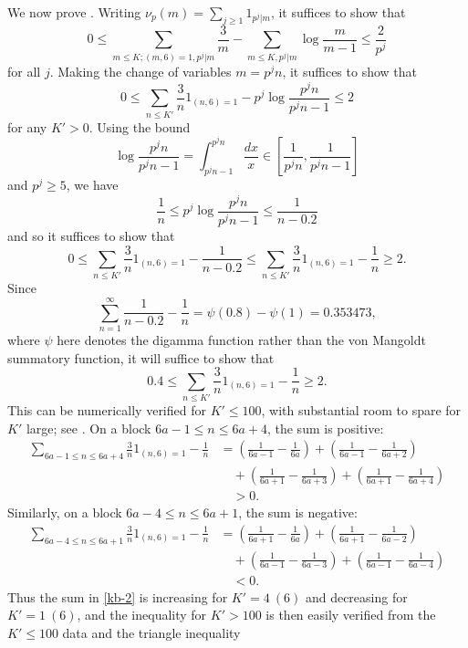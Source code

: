 \documentclass[12pt,a4paper,reqno]{amsart}
\numberwithin{equation}{section}
\theoremstyle{plain}
\theoremstyle{definition}
\begin{document}
We now prove . Writing $\nu_p(m) = \sum_{j \geq 1} 1_{p^j|m}$, it suffices to show that
  $$ 0 \leq \sum_{m \leq K; (m,6)=1, p^j|m} \frac{3}{m}
  - \sum_{m \leq K, p^j|m} \log \frac{m}{m-1} \leq \frac{2}{p^j}$$
  for all $j$.  Making the change of variables $m = p^j n$, it suffices to show that
  $$ 0 \leq \sum_{n \leq K'} \frac{3}{n} 1_{(n,6)=1} - p^j \log \frac{p^j n}{p^j n - 1} \leq 2$$
  for any $K' > 0$.   Using the bound
  $$ \log \frac{p^jn}{p^jn - 1} = \int_{p^jn-1}^{p^jn} \frac{dx}{x} \in [\frac{1}{p^j n}, \frac{1}{p^jn-1}]$$
  and $p^j \geq 5$, we have
  $$ \frac{1}{n} \leq p^j \log \frac{p^j n}{p^j n - 1} \leq \frac{1}{n-0.2}$$
  and so it suffices to show that
  \begin{equation}\label{kb}
  0 \leq \sum_{n \leq K'} \frac{3}{n} 1_{(n,6)=1} - \frac{1}{n-0.2} 
  \leq
  \sum_{n \leq K'} \frac{3}{n} 1_{(n,6)=1} - \frac{1}{n} \geq 2.
  \end{equation}
  Since 
  $$ \sum_{n=1}^\infty \frac{1}{n-0.2}-\frac{1}{n} = \psi(0.8)-\psi(1) = 0.353473,$$
  where $\psi$ here denotes the digamma function rather than the von Mangoldt summatory function, it will suffice to show that
  \begin{equation}\label{kb-2} 0.4 \leq
  \sum_{n \leq K'} \frac{3}{n} 1_{(n,6)=1} - \frac{1}{n} \geq 2.\end{equation}
  This can be numerically verified for $K' \leq 100$, with substantial room to spare for $K'$ large; see . On a block $6a-1 \leq n \leq 6a+4$, the sum is positive:
  \begin{align*}
  \sum_{6a-1 \leq n \leq 6a+4} \frac{3}{n} 1_{(n,6)=1} - \frac{1}{n } &= \left(\frac{1}{6a-1} - \frac{1}{6a}\right) + \left(\frac{1}{6a-1} - \frac{1}{6a+2}\right)\\
  &\quad + \left(\frac{1}{6a+1} - \frac{1}{6a+3}\right) + \left(\frac{1}{6a+1} - \frac{1}{6a+4}\right) \\
  &\quad > 0.
  \end{align*}
  Similarly, on a block $6a-4 \leq n \leq 6a+1$, the sum is negative:
  \begin{align*}
    \sum_{6a-4 \leq n \leq 6a+1} \frac{3}{n} 1_{(n,6)=1} - \frac{1}{n } &= \left(\frac{1}{6a+1} - \frac{1}{6a}\right)
    + \left(\frac{1}{6a+1} - \frac{1}{6a-2}\right)\\
    &\quad  + \left(\frac{1}{6a-1} - \frac{1}{6a-3}\right)
    + \left(\frac{1}{6a-1} - \frac{1}{6a-4}\right)\\
    &\quad  < 0.
  \end{align*}
  Thus the sum in \eqref{kb-2} is increasing for $K' = 4\ (6)$ and decreasing for $K' = 1\ (6)$, and the inequality for $K'>100$ is then easily verified from the $K' \leq 100$ data and the triangle inequality
  
\end{document}
